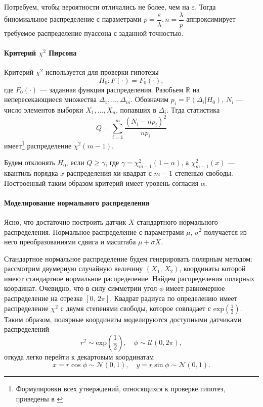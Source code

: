 \documentclass[16pt]{article}
\newcommand\Real{\mathbb{R}}
\newcommand\A{(\cdot)}
\newcommand\Sum[2]{\sum\limits_{#1}^{#2}}
\newcommand{\Prb}{\mathbb{P}}
\begin{document}
Потребуем, чтобы вероятности отличались не более, чем на $\varepsilon$. Тогда биномиальное распределение с параметрами $p = \dfrac{\varepsilon}{\lambda}, n = \dfrac{\lambda}{p}$ аппроксимирует требуемое распределение пуассона с заданной точностью.

\paragraph{Критерий $\chi^2$ Пирсона} 
Критерий $\chi^2$ используется для проверки гипотезы
$$H_0\colon F\A = F_0\A,$$
где $F_0\A$ --- заданная функция распределения. Разобьем $\Real$ на непересекающиеся множества $\Delta_1, \ldots, \Delta_m$. Обозначим $p_i = \Prb(\Delta_i | H_0)$, $N_i$ --- число элементов выборки $X_1, \ldots, X_n$, попавших в $\Delta_i$. Тгда статистика 
$$Q = \Sum{i=1}{m}\dfrac{(N_i - np_i)^2}{np_i}$$
имеет\footnote{Формулировки всех утверждений, относящихся к проверке гипотез, приведены в \cite{DeGroot}} распределение $\chi^2(m - 1)$.

Будем отклонять $H_0$, если $Q \geq \gamma$, где $\gamma = \chi^2_{m-1}(1 - \alpha)$, а $\chi^2_{m-1}(x)$ --- квантиль порядка $x$ распределения хи-квадрат с $m - 1$ степенью свободы. Построенный таким образом критерий имеет уровень согласия $\alpha$.

\paragraph{Моделирование нормального распределения}
Ясно, что достаточно построить датчик $X$ стандартного нормального распределения. Нормальное распределение с параметрами $\mu,\, \sigma^2$ получается из него преобразованиями сдвига и масштаба $\mu + \sigma X$.

Стандартное нормальное распределение будем генерировать полярным методом: рассмотрим двумерную случайную величину $(X_1,\, X_2)$, координаты которой имеют стандартное нормальное распределение. Найдем распределения полярных  координат. Очевидно, что в силу симметрии угол $\phi$ имеет равномерное распределение на отрезке $[0,\, 2\pi]$. Квадрат радиуса по определению имеет распределение $\chi^2$ с двумя степенями свободы, которое совпадает с $\mathrm{exp}\left(\frac12\right)$. Таким образом, полярные координаты моделируются доступными датчиками распределений
$$r^2 \sim \mathrm{exp}\left(\frac12\right), \quad \phi \sim \mathcal{U}(0, 2\pi),$$
откуда легко перейти к декартовым координатам
$$x = r \cos\phi \sim \mathcal{N}(0, 1), \quad y = r \sin \phi \sim \mathcal{N}(0, 1).$$
\end{document}
